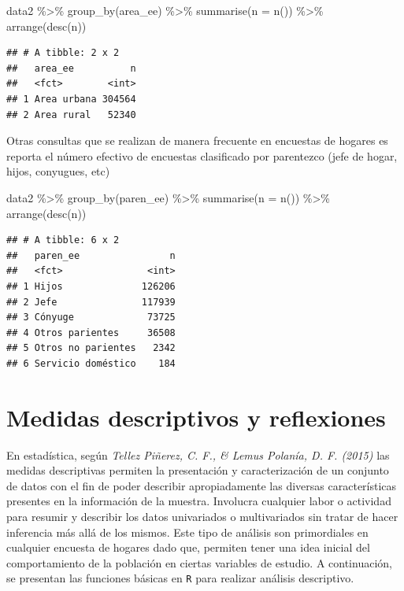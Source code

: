 \documentclass[
  12pt,
]{book}
\newenvironment{Shaded}{\begin{snugshade}}{\end{snugshade}}
\newcommand{\AttributeTok}[1]{\textcolor[rgb]{0.77,0.63,0.00}{#1}}
\newcommand{\FunctionTok}[1]{\textcolor[rgb]{0.00,0.00,0.00}{#1}}
\newcommand{\NormalTok}[1]{#1}
\newcommand{\SpecialCharTok}[1]{\textcolor[rgb]{0.00,0.00,0.00}{#1}}
\begin{document}
\begin{Shaded}
\begin{Highlighting}[]
\NormalTok{data2 }\SpecialCharTok{\%\textgreater{}\%} 
  \FunctionTok{group\_by}\NormalTok{(area\_ee) }\SpecialCharTok{\%\textgreater{}\%} 
  \FunctionTok{summarise}\NormalTok{(}\AttributeTok{n =} \FunctionTok{n}\NormalTok{()) }\SpecialCharTok{\%\textgreater{}\%} \FunctionTok{arrange}\NormalTok{(}\FunctionTok{desc}\NormalTok{(n))}
\end{Highlighting}
\end{Shaded}

\begin{verbatim}
## # A tibble: 2 x 2
##   area_ee          n
##   <fct>        <int>
## 1 Area urbana 304564
## 2 Area rural   52340
\end{verbatim}

Otras consultas que se realizan de manera frecuente en encuestas de hogares es reporta el número efectivo de encuestas clasificado por parentezco (jefe de hogar, hijos, conyugues, etc)

\begin{Shaded}
\begin{Highlighting}[]
\NormalTok{data2 }\SpecialCharTok{\%\textgreater{}\%} 
  \FunctionTok{group\_by}\NormalTok{(paren\_ee) }\SpecialCharTok{\%\textgreater{}\%} 
  \FunctionTok{summarise}\NormalTok{(}\AttributeTok{n =} \FunctionTok{n}\NormalTok{()) }\SpecialCharTok{\%\textgreater{}\%} \FunctionTok{arrange}\NormalTok{(}\FunctionTok{desc}\NormalTok{(n)) }
\end{Highlighting}
\end{Shaded}

\begin{verbatim}
## # A tibble: 6 x 2
##   paren_ee                n
##   <fct>               <int>
## 1 Hijos              126206
## 2 Jefe               117939
## 3 Cónyuge             73725
## 4 Otros parientes     36508
## 5 Otros no parientes   2342
## 6 Servicio doméstico    184
\end{verbatim}

\hypertarget{medidas-descriptivos-y-reflexiones}{%
\section{Medidas descriptivos y reflexiones}\label{medidas-descriptivos-y-reflexiones}}

En estadística, según \emph{Tellez Piñerez, C. F., \& Lemus Polanía, D. F. (2015)} las medidas descriptivas permiten la presentación y caracterización de un conjunto de datos con el fin de poder describir apropiadamente las diversas características presentes en la información de la muestra. Involucra cualquier labor o actividad para resumir y describir los datos univariados o multivariados sin tratar de hacer inferencia más allá de los mismos. Este tipo de análisis son primordiales en cualquier encuesta de hogares dado que, permiten tener una idea inicial del comportamiento de la población en ciertas variables de estudio. A continuación, se presentan las funciones básicas en \texttt{R} para realizar análisis descriptivo.
\end{document}
